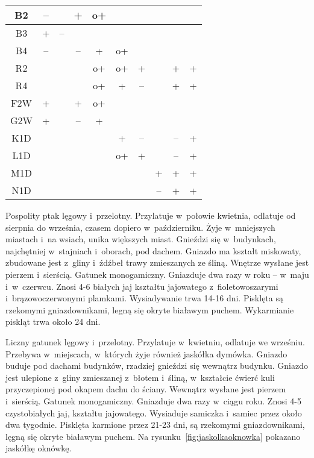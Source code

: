 \documentclass[a4paper,10pt]{report}
\begin{document}
\begin{longtable}{|c|c|c|c|c|c|c|c|c|c|}
		B2 & -- &  & + & o+ &  &  &  &  &  \\ \hline
		B3 & + & -- &  &  &  &  &  &  &  \\ \hline
		B4 & -- &  & -- & + & o+ &  &  &  &  \\ \hline
		R2 &  &  &  & o+ & o+ & + &  & + & + \\ \hline
		R4 &  &  &  & o+ & + & -- &  & + & + \\ \hline
		F2W & + &  & + & o+ &  &  &  &  &  \\ \hline
		G2W & + &  & -- & + &  &  &  &  &  \\ \hline
		K1D &  &  &  &  & + & -- &  & -- & + \\ \hline
		L1D &  &  &  &  & o+ & + &  & -- & + \\ \hline
		M1D &  &  &  &  &  &  & + & + & + \\ \hline
		N1D &  &  &  &  &  &  & -- & + & + \\ \hline
	\end{longtable}
	
	Pospolity ptak lęgowy i~przelotny. Przylatuje w~połowie kwietnia, odlatuje od sierpnia do września, czasem dopiero w~październiku. Żyje w~mniejszych miastach i~na wsiach, unika większych miast. Gnieździ się w~budynkach, najchętniej w~stajniach i~oborach, pod dachem. Gniazdo ma kształt miskowaty, zbudowane jest z~gliny i~źdźbeł trawy zmieszanych ze śliną. Wnętrze wysłane jest pierzem i~sierścią. Gatunek monogamiczny. Gniazduje dwa razy w roku -- w~maju i~w~czerwcu. Znosi 4-6 białych jaj kształtu jajowatego z~fioletowoszarymi i~brązowoczerwonymi plamkami. Wysiadywanie trwa 14-16 dni. Pisklęta są rzekomymi gniazdownikami, legną się okryte białawym puchem. Wykarmianie piskląt trwa około 24 dni. 
	
	

	
	Liczny gatunek lęgowy i~przelotny. Przylatuje w~kwietniu, odlatuje we wrześniu. Przebywa w~miejscach, w~których żyje również jaskółka dymówka. Gniazdo buduje pod dachami budynków, rzadziej gnieździ się wewnątrz budynku. Gniazdo jest ulepione z~gliny zmieszanej z~błotem i~śliną, w~kształcie ćwierć kuli przyczepionej pod okapem dachu do ściany. Wewnątrz wysłane jest pierzem i~sierścią. Gatunek monogamiczny. Gniazduje dwa razy w~ciągu roku. Znosi 4-5 czystobiałych jaj, kształtu jajowatego. Wysiaduje samiczka i~samiec przez około dwa tygodnie. Pisklęta karmione przez 21-23 dni, są rzekomymi gniazdownikami, lęgną się okryte białawym puchem. Na rysunku~\ref{fig:jaskolkaoknowka} pokazano jaskółkę oknówkę.
	
\end{document}
